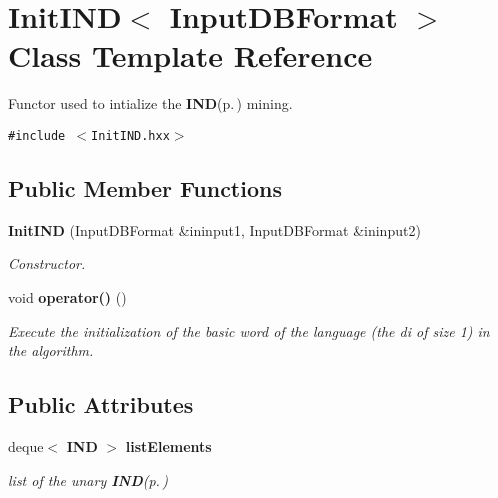 \section{Init\-IND$<$ Input\-DBFormat $>$ Class Template Reference}
\label{class_init_i_n_d}
Functor used to intialize the {\bf IND}{\rm (p.\,\pageref{class_i_n_d})} mining.  


{\tt \#include $<$Init\-IND.hxx$>$}

\subsection*{Public Member Functions}
\begin{CompactItemize}
\item 
{\bf Init\-IND} (Input\-DBFormat \&ininput1, Input\-DBFormat \&ininput2)\label{class_init_i_n_d_5fa698ef8b2c267a5d2c4883a7065604}

\begin{CompactList}\small\item\em Constructor. \item\end{CompactList}\item 
void {\bf operator()} ()\label{class_init_i_n_d_f9c79264f50185ebfecaf071b1021411}

\begin{CompactList}\small\item\em Execute the initialization of the basic word of the language (the di of size 1) in the algorithm. \item\end{CompactList}\end{CompactItemize}
\subsection*{Public Attributes}
\begin{CompactItemize}
\item 
deque$<$ {\bf IND} $>$ {\bf list\-Elements}\label{class_init_i_n_d_3eca6bee3e17f420c62bd89edd5c06c5}

\begin{CompactList}\small\item\em list of the unary {\bf IND}{\rm (p.\,\pageref{class_i_n_d})} \item\end{CompactList}\end{CompactItemize}
